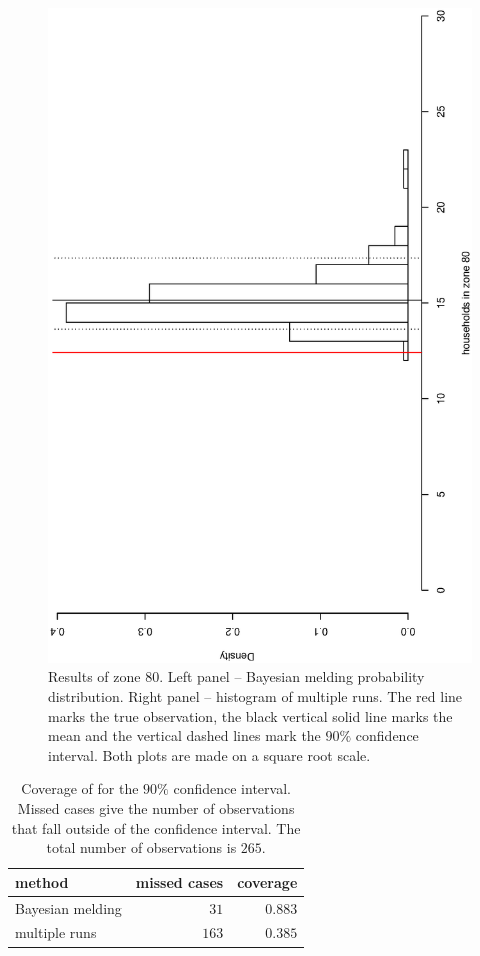 \documentclass[11pt, fleqn]{article}
\begin{document}
\begin{figure}[t]
\begin{center}
\begin{minipage}{8cm}
\includegraphics[scale=0.3, angle=-90]{pic/hu_mr_hist_zone80.ps}
\end{minipage}
\caption{\label{fig:distr-bm-mr-1zone}\small Results of zone 80. Left panel --
  Bayesian melding probability distribution. Right panel -- histogram of
  multiple runs. The red line marks the true observation, the
black vertical solid line marks the mean and the vertical dashed lines mark
the $90\%$ confidence interval. Both plots are made on a square root scale.}
\end{center}
\end{figure}

\begin{table}
\begin{center}
\begin{tabular}{l|rr}
method & missed cases & coverage \\\hline
Bayesian melding & $31$ &  $0.883$ \\
multiple runs & $163$ & $0.385$ 
\end{tabular}
\end{center}
\caption{\label{tab:coverage} Coverage of for the $90\%$ confidence
  interval. Missed cases give the number of observations that fall outside of
  the confidence interval. The total number of observations is $265$.}
\end{table}
\end{document}
